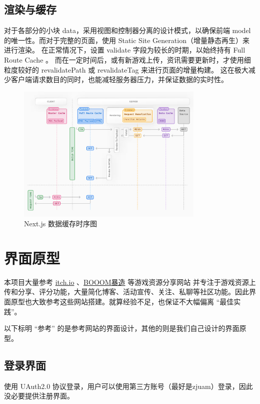 \documentclass[12pt]{ctexart} %
\begin{document}
\subsection{渲染与缓存}

对于各部分的小块 data，采用视图和控制器分离的设计模式，以确保前端 model 的唯一性。而对于完整的页面，使用 Static Site Generation（增量静态再生）来进行渲染。
在正常情况下，设置 validate 字段为较长的时期，以始终持有 Full Route Cache 。 而在一定时间后，或有新游戏上传，资讯需要更新时，才使用细粒度较好的 revalidatePath 或 revalidateTag 来进行页面的增量构建。
这在极大减少客户端请求数目的同时，也能减轻服务器压力，并保证数据的实时性。

\begin{figure}[H]
  \centering
  \includegraphics[width=0.8\textwidth]{Next-Cache.png}
  \caption{Next.js 数据缓存时序图}
\end{figure}

\section{界面原型}

本项目大量参考 \href{https://itch.io}{itch.io} 、\href{https://www.gcores.com/booom/game_lib}{BOOOM暴造} 等游戏资源分享网站
并专注于游戏资源上传和分享、评分功能，大量简化博客、活动宣传、关注、私聊等社区功能。因此界面原型也大致参考这些网站搭建。就算经验不足，也保证不大幅偏离 “最佳实践”。

以下标明 “参考” 的是参考网站的界面设计，其他的则是我们自己设计的界面原型。

\subsection{登录界面}

使用 UAuth2.0 协议登录，用户可以使用第三方账号（最好是zjuam）登录，因此没必要提供注册界面。
\end{document}
